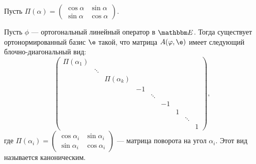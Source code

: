 Пусть $\Pi(\alpha) = \begin{pmatrix}
\cos\alpha & \sin\alpha \\
\sin\alpha & \cos\alpha
\end{pmatrix}$.

\begin{Theorem}
Пусть $\phi$ --- ортогональный линейный оператор в $\E$. Тогда существует ортонормированный базис $\e$ такой, что матрица $A(\phi, \e)$ имеет следующий блочно-диагональный вид:
$$
\begin{pmatrix}
\Pi(\alpha_1)\\
&\ddots \\
&&\Pi(\alpha_k)\\
&&&-1\\
&&&&\ddots\\
&&&&&-1\\
&&&&&& 1\\
&&&&&&& \ddots \\
&&&&&&&& 1
\end{pmatrix},
$$
где $\Pi(\alpha_i) =  \begin{pmatrix}
\cos\alpha_i & \sin\alpha_i \\
\sin\alpha_i & \cos\alpha_i
\end{pmatrix}$ --- матрица поворота на угол $\alpha_i$. Этот вид называется каноническим.
\end{Theorem}

